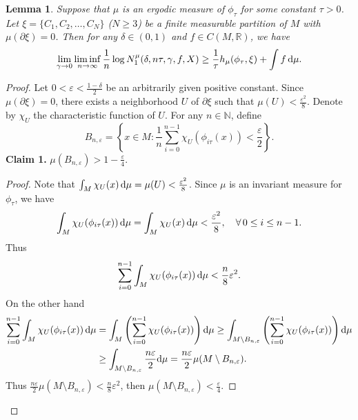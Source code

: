 \documentclass[10pt]{article}
\newtheorem*{Theorem A}{Theorem A}
\newtheorem{Lemma}[Theorem]{Lemma}
\begin{document}
\begin{Lemma}\label{lemma4.6}
Suppose that $\mu$ is an ergodic measure of \( \phi_\tau \) for some constant $\tau>0$. Let \( \xi = \{ C_1, C_2, \ldots, C_N \} \) (\( N \geq 3 \)) be a finite measurable partition of \( M \) with \( \mu(\partial \xi) = 0 \). Then for any \( \delta \in (0, 1) \) and \( f \in C(M, \mathbb{R}) \), we have
\[
\lim_{\gamma \to 0} \liminf_{n \to \infty} \frac{1}{n} \log N_1^\mu(\delta, n\tau, \gamma, f, X) \geq \frac{1}{\tau} h_\mu(\phi_\tau, \xi) + \int f \, {\rm d}\mu .
\]
\end{Lemma}
\begin{proof}
Let \( 0 < \varepsilon < \frac{1 - \delta}{2} \) be an arbitrarily given positive constant. Since \( \mu(\partial \xi) = 0 \), there exists a neighborhood \( U \) of \( \partial \xi \) such that \( \mu(U) < \frac{\varepsilon^2}{8} \). Denote by \( \chi_U \) the characteristic function of \( U \). For any \( n \in \mathbb{N} \), define
\[
B_{n, \varepsilon} = \left\{ x \in M : \frac{1}{n} \sum_{i=0}^{n-1} \chi_U(\phi_{i\tau}(x)) < \frac{\varepsilon }{2} \right\}.
\]
\noindent
\textbf{Claim 1. } \(\mu(B_{n, \varepsilon}) > 1 - \frac{\varepsilon}{4} \).

\bigskip


\noindent
\begin{proof} Note that \( \int_M \chi_U(x) \, {\rm d}\mu = \mu(U) < \frac{\varepsilon^2}{8} \). Since \( \mu \) is an invariant measure for \( \phi_\tau \), we have
\[
\int_M \chi_U ( \phi_{i\tau }(x)) \, {\rm d}\mu = \int_M \chi_U(x) \, {\rm d}\mu < \frac{\varepsilon^2}{8}, \quad \forall\, 0 \leq i \leq n-1.
\]
Thus
\[
\sum_{i=0}^{n-1} \int_M \chi_U( \phi_{i\tau }(x)) \, {\rm d}\mu < \frac{n }{8}\varepsilon^2.
\]
On the other hand
\begin{align*}
\sum_{i=0}^{n-1} \int_M \chi_U ( \phi_{i\tau }(x)) \, {\rm d}\mu &= \int_M \left( \sum_{i=0}^{n-1} \chi_U(\phi_{i\tau }(x)) \right) {\rm d}\mu\geq \int_{M \setminus B_{n, \varepsilon}} \left( \sum_{i=0}^{n-1} \chi_U(\phi_{i\tau }(x)) \right) {\rm d}\mu \\&\geq\int_{M \setminus B_{n, \varepsilon}} \frac{n\varepsilon}{2}{\rm d}\mu= \frac{n \varepsilon}{2} \mu(M \setminus B_{n, \varepsilon}).
\end{align*}
\noindent
Thus \( \frac{n\varepsilon}{2} \mu(M \setminus B_{n, \varepsilon}) < \frac{n}{8} \varepsilon^2 \), then \( \mu(M \setminus B_{n, \varepsilon}) < \frac{\varepsilon}{4} \).
\end{proof}


\end{proof}
\end{document}
